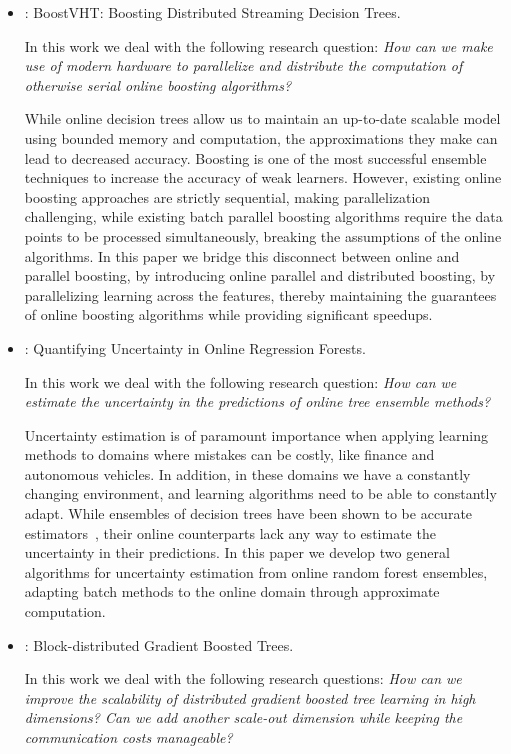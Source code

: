 \begin{itemize}
	\item \textbf{\boostvht}: BoostVHT: Boosting Distributed Streaming Decision Trees.

	In this work we deal with the following research question:
	\emph{How can we make use of modern hardware to parallelize and distribute
	the computation of otherwise serial online boosting algorithms?}

	While online decision trees allow us to maintain an up-to-date scalable
	model using bounded memory and computation, the approximations they make
	can lead to decreased accuracy.
	Boosting is one of the most successful ensemble techniques to increase the
	accuracy of weak learners. However, existing online boosting approaches
	are strictly sequential, making parallelization challenging, while existing batch parallel boosting algorithms
	require the data points to be processed simultaneously, breaking the assumptions
	of the online algorithms. In this paper we bridge
	this disconnect between online and parallel boosting, by introducing
	online parallel and distributed boosting, by parallelizing learning
	across the features, thereby maintaining the guarantees of online boosting
	algorithms while providing significant speedups.

	\item \textbf{\uncertaintrees}: Quantifying Uncertainty in Online Regression Forests.

	In this work we deal with the following research question:
	\emph{How can we estimate the uncertainty in the predictions of online tree
	ensemble methods?}

	Uncertainty estimation is of paramount importance when applying learning methods
	to domains where mistakes can be costly, like finance and autonomous vehicles.
	In addition, in these domains we have a constantly changing environment,
	and learning algorithms need to be able to constantly adapt. While ensembles
	of decision trees have been shown to be accurate estimators~\cite{hundreds-classifiers}, their online
	counterparts lack any way to estimate the uncertainty in their predictions.
	In this paper we develop two general algorithms for uncertainty estimation
	from online random forest ensembles, adapting batch methods to the online
	domain through approximate computation.


	\item \textbf{\blockgbt}: Block-distributed Gradient Boosted Trees.


	In this work we deal with the following research questions:
	\emph{How can we improve the scalability of distributed gradient boosted tree learning
	in high dimensions? Can we add another scale-out dimension while keeping the
	communication costs manageable?}


\end{itemize}
